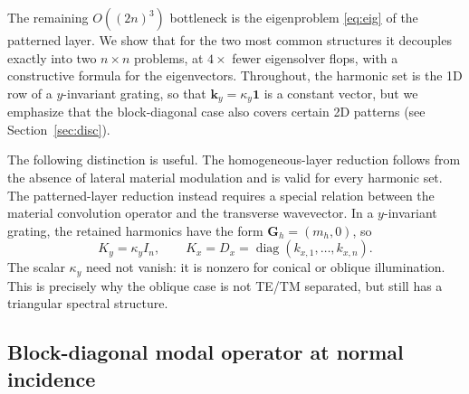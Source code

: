\documentclass[11pt]{article}
\theoremstyle{remark}
\newcommand{\kk}{\mathbf{k}}
\DeclareMathOperator{\diag}{diag}
\begin{document}
The remaining $O((2n)^3)$ bottleneck is the eigenproblem \eqref{eq:eig} of the
patterned layer. We show that for the two most common structures it decouples
exactly into two $n\times n$ problems, at $4\times$ fewer eigensolver flops,
with a constructive formula for the eigenvectors. Throughout, the harmonic set
is the 1D row of a $y$-invariant grating, so that
$\kk_y=\kappa_y\mathbf{1}$ is a constant vector, but we emphasize that the
block-diagonal case also covers certain 2D patterns (see
Section~\ref{sec:disc}).

The following distinction is useful.  The homogeneous-layer reduction follows
from the absence of lateral material modulation and is valid for every harmonic
set.  The patterned-layer reduction instead requires a special relation between
the material convolution operator and the transverse wavevector.  In a
$y$-invariant grating, the retained harmonics have the form
$\mathbf{G}_h=(m_h,0)$, so
\begin{equation}
K_y=\kappa_y I_n,
\qquad
K_x=D_x=\diag(k_{x,1},\ldots,k_{x,n}).
\label{eq:one-dimensional-kinematics}
\end{equation}
The scalar $\kappa_y$ need not vanish: it is nonzero for conical or oblique
illumination.  This is precisely why the oblique case is not TE/TM separated,
but still has a triangular spectral structure.

\subsection{Block-diagonal modal operator at normal incidence}
\label{sec:bd}
\end{document}
